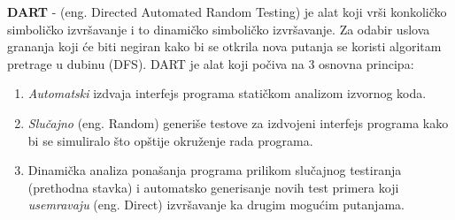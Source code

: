 \documentclass[12pt]{article}
\begin{document}
\bigskip
\textbf{DART} - (eng. Directed Automated Random Testing) je alat koji vrši konkoličko simboličko izvršavanje i to dinamičko simboličko izvršavanje. Za odabir uslova grananja koji će biti negiran kako bi se otkrila nova putanja se koristi algoritam pretrage u dubinu (DFS). DART je alat koji počiva na 3 osnovna principa:
\begin{enumerate}
    \item\textit{Automatski} izdvaja interfejs programa statičkom analizom izvornog koda.
    
    \item\textit{Slučajno} (eng. Random) generiše testove za izdvojeni interfejs programa kako bi se simuliralo što opštije okruženje rada programa.
    
    \item Dinamička analiza ponašanja programa prilikom slučajnog testiranja (prethodna stavka) i automatsko generisanje novih test primera koji \textit{usemravaju} (eng. Direct) izvršavanje ka drugim mogućim putanjama.
\end{enumerate}
\end{document}
